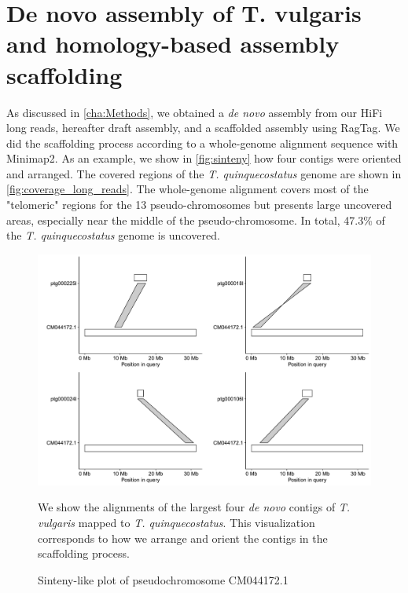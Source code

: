 \section*{De novo assembly of T. vulgaris and homology-based assembly scaffolding}

As discussed in \autoref{cha:Methods}, we obtained a \textit{de novo} assembly from our \ac{HiFi} long reads, hereafter draft assembly, and a scaffolded assembly using RagTag. We did the scaffolding process according to a whole-genome alignment sequence with Minimap2. As an example, we show in \autoref{fig:sinteny} how four contigs were oriented and arranged. The covered regions of the \textit{T. quinquecostatus} genome are shown in \autoref{fig:coverage_long_reads}. The whole-genome alignment covers most of the "telomeric" regions for the 13 pseudo-chromosomes but presents large uncovered areas, especially near the middle of the pseudo-chromosome. In total, 47.3\% of the \textit{T. quinquecostatus} genome is uncovered. \\

\begin{figure}
\begin{center}
    \includegraphics[width=\textwidth]{gfx/CM044172.1_sinteny.pdf}
    \caption{Sinteny-like plot of pseudochromosome CM044172.1}  
    \label{fig:sinteny}    
\end{center}
\footnotesize
We show the alignments of the largest four \textit{de novo} contigs of \textit{T. vulgaris} mapped to \textit{T. quinquecostatus}. This visualization corresponds to how we arrange and orient the contigs in the scaffolding process. 
\end{figure} 

